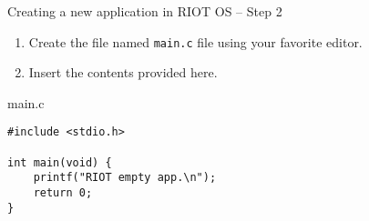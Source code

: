 \documentclass[aspectratio=169]{beamer}
\newcounter{saveenumi}
\newcommand{\seti}{\setcounter{saveenumi}{\value{enumi}}}
\newcommand{\conti}{\setcounter{enumi}{\value{saveenumi}}}
\begin{document}
\begin{frame}[fragile]{Creating a new application in RIOT OS -- Step 2} 

\begin{enumerate}

\conti

\item<1-> Create the file named \texttt{main.c} file using your favorite editor.

\item<2-> Insert the contents provided here.

\seti

\end{enumerate}

\vspace{.5cm}

\begin{exampleblock}{main.c}
\begin{verbatim}
#include <stdio.h>

int main(void) {
    printf("RIOT empty app.\n");
    return 0;
}
\end{verbatim}
\end{exampleblock}

\vspace{4cm}
\end{frame}
\end{document}
